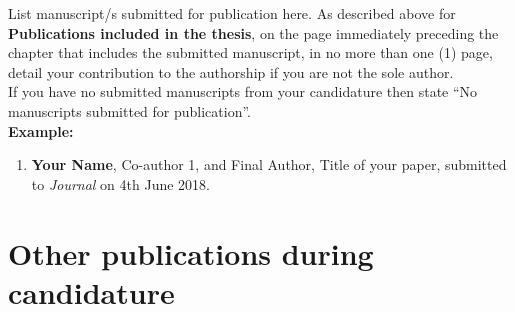 \begin{instructional}
	List manuscript/s submitted for publication here. As described above for \textbf{Publications included in the thesis}, on the page immediately preceding the chapter that includes the submitted manuscript, in no more than one (1) page, detail your contribution to the authorship if you are not the sole author.\\
    
    \noindent
    If you have no submitted manuscripts from your candidature then state ``No manuscripts submitted for publication''.\\
    
    \textbf{Example:}
    \begin{enumerate}

    \item \cite{DumyCitationKey} \textbf{Your Name}, Co-author 1, and Final Author, Title of your paper, submitted to \textit{Journal} on 4th June 2018.

    \end{enumerate}
\end{instructional}





\section*{Other publications during candidature}

